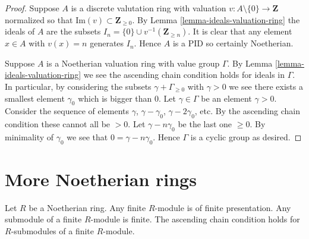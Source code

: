 \begin{proof}
Suppose $A$ is a discrete valutation ring
with valuation $v : A \setminus \{0\} \to \mathbf{Z}$
normalized so that $\text{Im}(v) \subset \mathbf{Z}_{\geq 0}$.
By Lemma \ref{lemma-ideals-valuation-ring} the ideals of $A$ are the subsets
$I_n = \{0\} \cup v^{-1}(\mathbf{Z}_{\geq n})$. It is clear
that any element $x \in A$ with $v(x) = n$ generates $I_n$.
Hence $A$ is a PID so certainly Noetherian.

\medskip\noindent
Suppose $A$ is a Noetherian valuation ring with value group $\Gamma$.
By Lemma \ref{lemma-ideals-valuation-ring} we see the ascending chain
condition holds for ideals in $\Gamma$. In particular, by considering
the subsets $\gamma + \Gamma_{\geq 0}$ with $\gamma > 0$ we see
there exists a smallest element $\gamma_0$ which is bigger than $0$.
Let $\gamma \in \Gamma$ be an element $\gamma > 0$. Consider the sequence
of elements $\gamma$, $\gamma - \gamma_0$, $\gamma - 2\gamma_0$,
etc. By the ascending chain condition these cannot all be $> 0$.
Let $\gamma - n \gamma_0$ be the last one $\geq 0$. By minimality
of $\gamma_0$ we see that $0 = \gamma - n \gamma_0$. Hence $\Gamma$
is a cyclic group as desired.
\end{proof}























\section{More Noetherian rings}
\label{section-Noetherian-again}


\begin{lemma}
\label{lemma-Noetherian-basic}
Let $R$ be a Noetherian ring.
Any finite $R$-module is of finite presentation.
Any submodule of a finite $R$-module is finite.
The ascending chain condition holds for $R$-submodules
of a finite $R$-module.
\end{lemma}

